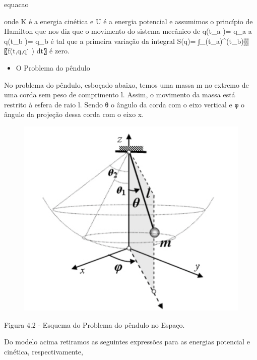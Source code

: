 \documentclass[12pt, a4paper]{article}
\begin{document}
\begin{center}
equacao
\end{center}

onde K é a energia cinética e U é a energia potencial e assumimos o princípio de Hamilton que nos diz que o movimento do sistema mecânico de q(t_a )= q_a   a  q(t_b )= q_b é tal que a primeira variação da integral S(q)= ∫_(t_a)^(t_b)▒〖f(t,q,q ̇ )  dt〗 é zero.


\begin{itemize}
\item O Problema do pêndulo
\end{itemize}

No problema do pêndulo, esboçado abaixo, temos uma massa m no extremo de uma corda sem peso de comprimento l. Assim, o movimento da massa está restrito à esfera de raio l. Sendo θ o ângulo da corda com o eixo vertical e φ o ângulo da projeção dessa corda com o eixo x.

\begin{figure}[!h]
    \centering
    \includegraphics[scale=1.2]{imgs/pendulo.PNG}

  \end{figure}
  
\begin{center}
  Figura 4.2 - Esquema do Problema do pêndulo no Espaço.
  \end{center}  
  
Do modelo acima retiramos as seguintes expressões para as energias potencial e cinética, respectivamente,
\end{document}
